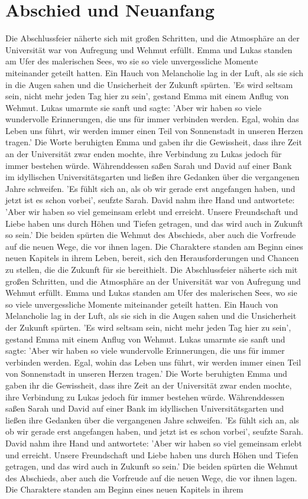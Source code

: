 \documentclass[12pt]{article} %
\begin{document}
\section{ Abschied und Neuanfang }
 Die Abschlussfeier näherte sich mit großen Schritten, und die Atmosphäre an der Universität war von Aufregung und Wehmut erfüllt. Emma und Lukas standen am Ufer des malerischen Sees, wo sie so viele unvergessliche Momente miteinander geteilt hatten. Ein Hauch von Melancholie lag in der Luft, als sie sich in die Augen sahen und die Unsicherheit der Zukunft spürten. 'Es wird seltsam sein, nicht mehr jeden Tag hier zu sein', gestand Emma mit einem Anflug von Wehmut. Lukas umarmte sie sanft und sagte: 'Aber wir haben so viele wundervolle Erinnerungen, die uns für immer verbinden werden. Egal, wohin das Leben uns führt, wir werden immer einen Teil von Sonnenstadt in unseren Herzen tragen.' Die Worte beruhigten Emma und gaben ihr die Gewissheit, dass ihre Zeit an der Universität zwar enden mochte, ihre Verbindung zu Lukas jedoch für immer bestehen würde. Währenddessen saßen Sarah und David auf einer Bank im idyllischen Universitätsgarten und ließen ihre Gedanken über die vergangenen Jahre schweifen. 'Es fühlt sich an, als ob wir gerade erst angefangen haben, und jetzt ist es schon vorbei', seufzte Sarah. David nahm ihre Hand und antwortete: 'Aber wir haben so viel gemeinsam erlebt und erreicht. Unsere Freundschaft und Liebe haben uns durch Höhen und Tiefen getragen, und das wird auch in Zukunft so sein.' Die beiden spürten die Wehmut des Abschieds, aber auch die Vorfreude auf die neuen Wege, die vor ihnen lagen. Die Charaktere standen am Beginn eines neuen Kapitels in ihrem Leben, bereit, sich den Herausforderungen und Chancen zu stellen, die die Zukunft für sie bereithielt. Die Abschlussfeier näherte sich mit großen Schritten, und die Atmosphäre an der Universität war von Aufregung und Wehmut erfüllt. Emma und Lukas standen am Ufer des malerischen Sees, wo sie so viele unvergessliche Momente miteinander geteilt hatten. Ein Hauch von Melancholie lag in der Luft, als sie sich in die Augen sahen und die Unsicherheit der Zukunft spürten. 'Es wird seltsam sein, nicht mehr jeden Tag hier zu sein', gestand Emma mit einem Anflug von Wehmut. Lukas umarmte sie sanft und sagte: 'Aber wir haben so viele wundervolle Erinnerungen, die uns für immer verbinden werden. Egal, wohin das Leben uns führt, wir werden immer einen Teil von Sonnenstadt in unseren Herzen tragen.' Die Worte beruhigten Emma und gaben ihr die Gewissheit, dass ihre Zeit an der Universität zwar enden mochte, ihre Verbindung zu Lukas jedoch für immer bestehen würde. Währenddessen saßen Sarah und David auf einer Bank im idyllischen Universitätsgarten und ließen ihre Gedanken über die vergangenen Jahre schweifen. 'Es fühlt sich an, als ob wir gerade erst angefangen haben, und jetzt ist es schon vorbei', seufzte Sarah. David nahm ihre Hand und antwortete: 'Aber wir haben so viel gemeinsam erlebt und erreicht. Unsere Freundschaft und Liebe haben uns durch Höhen und Tiefen getragen, und das wird auch in Zukunft so sein.' Die beiden spürten die Wehmut des Abschieds, aber auch die Vorfreude auf die neuen Wege, die vor ihnen lagen. Die Charaktere standen am Beginn eines neuen Kapitels in ihrem 
\end{document}
